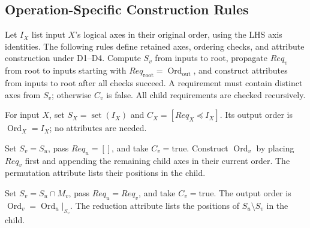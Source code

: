\subsection{Operation-Specific Construction Rules}
\label{app:operation-construction-rules}
Let $I_X$ list input $X$'s logical axes in their original order, using the
LHS axis identities. The following rules define retained axes, ordering
checks, and attribute construction under D1--D4. Compute $S_v$ from inputs
to root, propagate $Req_v$ from root to inputs starting with
$Req_{\mathrm{root}}=\operatorname{Ord}_{\mathrm{out}}$, and construct attributes from inputs to root after
all checks succeed. A requirement must contain distinct axes from $S_v$;
otherwise $C_v$ is false. All child requirements are checked recursively.

For input $X$, set $S_X=\operatorname{set}(I_X)$ and
$C_X=[Req_X\preceq I_X]$. Its output order is
$\operatorname{Ord}_X=I_X$; no attributes are needed.

Set $S_v=S_u$, pass $Req_u=[]$, and take $C_v=\mathrm{true}$.
Construct $\operatorname{Ord}_v$ by placing $Req_v$ first and appending
the remaining child axes in their current order. The permutation attribute
lists their positions in the child.

Set $S_v=S_u\cap M_v$, pass $Req_u=Req_v$, and take
$C_v=\mathrm{true}$. The output order is
$\operatorname{Ord}_v=\operatorname{Ord}_u|_{S_v}$.
The reduction attribute lists the positions of $S_u\setminus S_v$
in the child.

